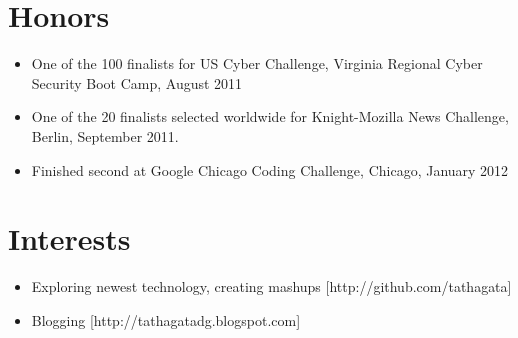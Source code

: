 \documentclass[a4paper, oneside, final]{scrartcl}
\begin{document}
\begin{center}

\section{Honors}
\begin{itemize}
\small\sffamily{}
\item One of the 100 finalists for US Cyber Challenge, Virginia Regional Cyber Security Boot Camp, August 2011
\vspace{-0.3cm}
\item One of the 20 finalists selected worldwide for Knight-Mozilla News Challenge, Berlin, September 2011.
\vspace{-0.3cm}
\item Finished second at Google Chicago Coding Challenge, Chicago, January 2012
\end{itemize} 

\section{Interests}
\begin{itemize}
\small\sffamily{}
\item Exploring newest technology, creating mashups [http://github.com/tathagata]
\vspace{-0.3cm}
\item Blogging [http://tathagatadg.blogspot.com]
\end{itemize} 


\end{center}
\end{document}

